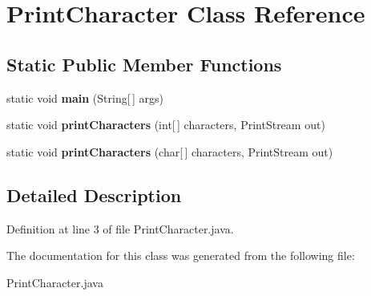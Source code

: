 \section{Print\-Character Class Reference}
\label{classPrintCharacter}
\subsection*{Static Public Member Functions}
\begin{CompactItemize}
\item 
static void {\bf main} (String[$\,$] args)\label{classPrintCharacter_092f9ab78a81278c4a5c5e26ea2a28f2}

\item 
static void {\bf print\-Characters} (int[$\,$] characters, Print\-Stream out)\label{classPrintCharacter_ab9d8a7439502fab171e7e631552a47c}

\item 
static void {\bf print\-Characters} (char[$\,$] characters, Print\-Stream out)\label{classPrintCharacter_fa2027cd872c6d684d375f2ac61081a3}

\end{CompactItemize}


\subsection{Detailed Description}




Definition at line 3 of file Print\-Character.java.

The documentation for this class was generated from the following file:\begin{CompactItemize}
\item 
Print\-Character.java\end{CompactItemize}
